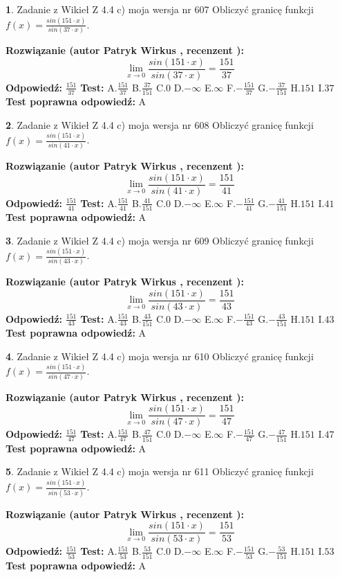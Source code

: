 \documentclass[12pt, a4paper]{article}
\theoremstyle{definition} %
\newtheorem{zad}{}
\newcommand{\zadStart}[1]{\begin{zad}#1\newline}
\newcommand{\zadStop}{\end{zad}}
\newcommand{\rozwStart}[2]{\noindent \textbf{Rozwiązanie (autor #1 , recenzent #2): }\newline}
\newcommand{\rozwStop}{\newline}
\newcommand{\odpStart}{\noindent \textbf{Odpowiedź:}\newline}
\newcommand{\odpStop}{\newline}
\newcommand{\testStart}{\noindent \textbf{Test:}\newline}
\newcommand{\testStop}{\newline}
\newcommand{\kluczStart}{\noindent \textbf{Test poprawna odpowiedź:}\newline}
\newcommand{\kluczStop}{\newline}
\begin{document}
\zadStart{Zadanie z Wikieł Z 4.4 c) moja wersja nr 607}
Obliczyć granicę funkcji $f(x)=\frac{sin(151\cdot x)}{sin(37\cdot x)}$.
\zadStop
\rozwStart{Patryk Wirkus}{}
$$\lim\limits_{x\to 0}\frac{sin(151\cdot x)}{sin(37\cdot x)}=
\frac{151}{37}$$
\rozwStop
\odpStart
$\frac{151}{37}$
\odpStop
\testStart
A.$\frac{151}{37}$
B.$\frac{37}{151}$
C.$0$
D.$-\infty$
E.$\infty$
F.$-\frac{151}{37}$
G.$-\frac{37}{151}$
H.$151$
I.$37$
\testStop
\kluczStart
A
\kluczStop



\zadStart{Zadanie z Wikieł Z 4.4 c) moja wersja nr 608}
Obliczyć granicę funkcji $f(x)=\frac{sin(151\cdot x)}{sin(41\cdot x)}$.
\zadStop
\rozwStart{Patryk Wirkus}{}
$$\lim\limits_{x\to 0}\frac{sin(151\cdot x)}{sin(41\cdot x)}=
\frac{151}{41}$$
\rozwStop
\odpStart
$\frac{151}{41}$
\odpStop
\testStart
A.$\frac{151}{41}$
B.$\frac{41}{151}$
C.$0$
D.$-\infty$
E.$\infty$
F.$-\frac{151}{41}$
G.$-\frac{41}{151}$
H.$151$
I.$41$
\testStop
\kluczStart
A
\kluczStop



\zadStart{Zadanie z Wikieł Z 4.4 c) moja wersja nr 609}
Obliczyć granicę funkcji $f(x)=\frac{sin(151\cdot x)}{sin(43\cdot x)}$.
\zadStop
\rozwStart{Patryk Wirkus}{}
$$\lim\limits_{x\to 0}\frac{sin(151\cdot x)}{sin(43\cdot x)}=
\frac{151}{43}$$
\rozwStop
\odpStart
$\frac{151}{43}$
\odpStop
\testStart
A.$\frac{151}{43}$
B.$\frac{43}{151}$
C.$0$
D.$-\infty$
E.$\infty$
F.$-\frac{151}{43}$
G.$-\frac{43}{151}$
H.$151$
I.$43$
\testStop
\kluczStart
A
\kluczStop



\zadStart{Zadanie z Wikieł Z 4.4 c) moja wersja nr 610}
Obliczyć granicę funkcji $f(x)=\frac{sin(151\cdot x)}{sin(47\cdot x)}$.
\zadStop
\rozwStart{Patryk Wirkus}{}
$$\lim\limits_{x\to 0}\frac{sin(151\cdot x)}{sin(47\cdot x)}=
\frac{151}{47}$$
\rozwStop
\odpStart
$\frac{151}{47}$
\odpStop
\testStart
A.$\frac{151}{47}$
B.$\frac{47}{151}$
C.$0$
D.$-\infty$
E.$\infty$
F.$-\frac{151}{47}$
G.$-\frac{47}{151}$
H.$151$
I.$47$
\testStop
\kluczStart
A
\kluczStop



\zadStart{Zadanie z Wikieł Z 4.4 c) moja wersja nr 611}
Obliczyć granicę funkcji $f(x)=\frac{sin(151\cdot x)}{sin(53\cdot x)}$.
\zadStop
\rozwStart{Patryk Wirkus}{}
$$\lim\limits_{x\to 0}\frac{sin(151\cdot x)}{sin(53\cdot x)}=
\frac{151}{53}$$
\rozwStop
\odpStart
$\frac{151}{53}$
\odpStop
\testStart
A.$\frac{151}{53}$
B.$\frac{53}{151}$
C.$0$
D.$-\infty$
E.$\infty$
F.$-\frac{151}{53}$
G.$-\frac{53}{151}$
H.$151$
I.$53$
\testStop
\kluczStart
A
\kluczStop
\end{document}
